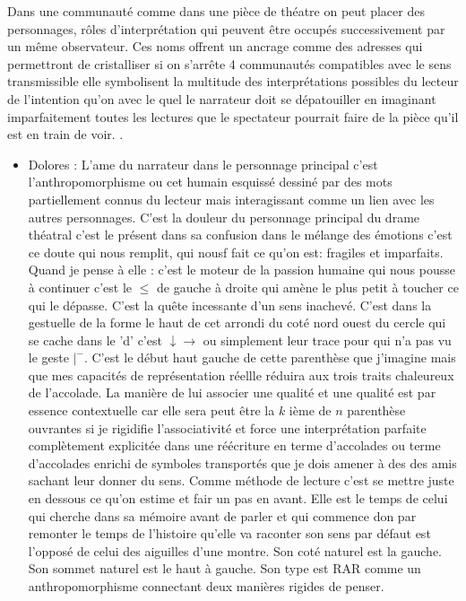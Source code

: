 \documentclass{article}
\begin{document}
Dans une communauté comme dans une pièce de théatre on peut placer des personnages, rôles d’interprétation qui peuvent être occupés successivement par un même observateur. Ces noms offrent un ancrage  comme des adresses  qui permettront de cristalliser si on s'arrête 4 communautés compatibles avec le sens transmissible elle symbolisent la multitude des interprétations possibles du lecteur de l'intention qu'on avec le quel le narrateur doit se dépatouiller en imaginant imparfaitement toutes les lectures que le spectateur pourrait faire de la pièce qu'il est en train de voir.
.
\begin{itemize}
\item Dolores : L'ame du narrateur dans le personnage principal c'est l'anthropomorphisme ou cet humain esquissé dessiné par des mots partiellement connus du lecteur mais interagissant comme un lien avec les autres personnages. C'est la douleur du personnage principal du drame théatral c'est le présent dans sa confusion dans le mélange des émotions c'est ce doute qui nous remplit, qui nousf fait ce qu'on est:  fragiles et imparfaits. Quand je pense à elle : c'est le moteur de la passion humaine qui nous pousse à continuer c'est le $\le$ de gauche à droite qui amène le plus petit à toucher ce qui le dépasse. C'est la quête incessante d'un sens inachevé. C'est dans la gestuelle de la forme le haut de cet arrondi du coté nord ouest du cercle qui se cache dans le 'd'  c'est $\downarrow \rightarrow$ ou simplement leur trace pour qui n'a pas vu le geste $|^-$. C'est le début haut gauche de cette parenthèse que j'imagine mais que mes capacités de représentation réellle réduira aux trois traits  chaleureux de l'accolade. La manière de lui associer une qualité et une qualité est par essence contextuelle car elle sera peut être la $k$ ième de $n$ parenthèse ouvrantes si je rigidifie l'associativité et force une interprétation parfaite complètement explicitée dans une réécriture en terme d'accolades ou terme d'accolades enrichi de symboles transportés que je dois amener à des des amis sachant leur donner du sens.  Comme méthode de lecture c'est se mettre juste en dessous ce qu'on estime et fair un pas en avant. Elle est le temps de celui qui cherche dans sa mémoire avant de parler et qui commence don par remonter le temps de l'histoire qu'elle va raconter son sens par défaut est l'opposé de celui des aiguilles d'une montre. Son coté naturel est la gauche. Son sommet naturel est le haut à gauche. Son type est RAR comme un anthropomorphisme connectant deux manières rigides de penser.




\end{itemize}
\end{document}
